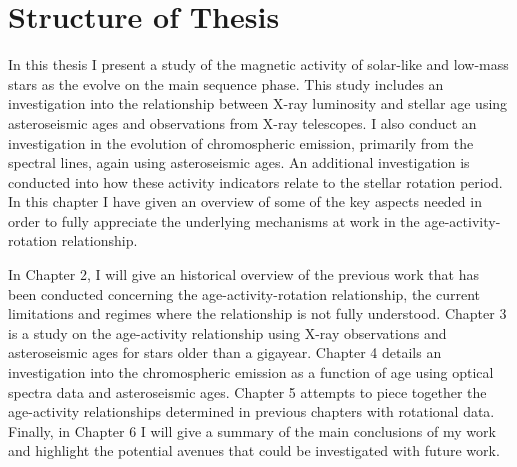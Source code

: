 \section{Structure of Thesis}
In this thesis I present a study of the magnetic activity of solar-like and low-mass stars as the evolve on the main sequence phase. This study includes an investigation into the relationship between X-ray luminosity and stellar age using asteroseismic ages and observations from X-ray telescopes. I also conduct an investigation in the evolution of chromospheric emission, primarily from the \caII spectral lines, again using asteroseismic ages. An additional investigation is conducted into how these activity indicators relate to the stellar rotation period. In this chapter I have given an overview of some of the key aspects needed in order to fully appreciate the underlying mechanisms at work in the age-activity-rotation relationship.

In Chapter 2, I will give an historical overview of the previous work that has been conducted concerning the age-activity-rotation relationship, the current limitations and regimes where the relationship is not fully understood. Chapter 3 is a study on the age-activity relationship using X-ray observations and asteroseismic ages for stars older than a gigayear. Chapter 4 details an investigation into the chromospheric emission as a function of age using optical spectra data and asteroseismic ages. Chapter 5 attempts to piece together the age-activity relationships determined in previous chapters with rotational data. Finally, in Chapter 6 I will give a summary of the main conclusions of my work and highlight the potential avenues that could be investigated with future work.
